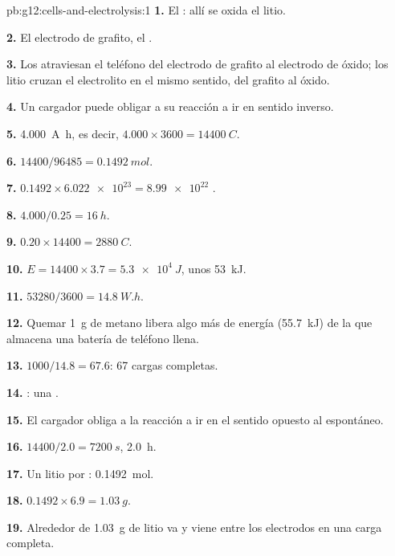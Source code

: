 \begin{solution}{pb:g12:cells-and-electrolysis:1}
\textbf{1.} El : allí se oxida el litio.

\textbf{2.} El electrodo de grafito, el .

\textbf{3.} Los  atraviesan el teléfono del electrodo de
grafito al electrodo de óxido; los  litio cruzan el electrolito en
el mismo sentido, del grafito al óxido.

\textbf{4.} Un cargador puede obligar a su reacción a ir en sentido
inverso.

\textbf{5.} \qty{4.000}{A.h}, es decir, $4.000 \times 3600 =
\qty{14400}{C}$.

\textbf{6.} $14400/96485 = \qty{0.1492}{mol}$.

\textbf{7.} $0.1492 \times \num{6.022e23} = \num{8.99e22}$ .

\textbf{8.} $4.000/0.25 = \qty{16}{h}$.

\textbf{9.} $0.20 \times 14400 = \qty{2880}{C}$.

\textbf{10.} $E = 14400 \times 3.7 = \qty{5.3e4}{J}$, unos \qty{53}{kJ}.

\textbf{11.} $53280/3600 = \qty{14.8}{W.h}$.

\textbf{12.} Quemar \qty{1}{g} de metano libera algo más de energía
(\qty{55.7}{kJ}) de la que almacena una batería de teléfono llena.

\textbf{13.} $1000/14.8 = 67.6$: 67 cargas completas.

\textbf{14.} : una .

\textbf{15.} El cargador obliga a la reacción a ir en el sentido opuesto
al espontáneo.

\textbf{16.} $14400/2.0 = \qty{7200}{s}$, \qty{2.0}{h}.

\textbf{17.} Un  litio por : \qty{0.1492}{mol}.

\textbf{18.} $0.1492 \times 6.9 = \qty{1.03}{g}$.

\textbf{19.} Alrededor de \qty{1.03}{g} de litio va y viene entre los
electrodos en una carga completa.
\end{solution}
